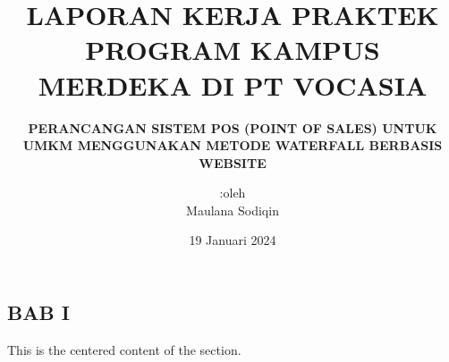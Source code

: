 \documentclass{article}
\date{19 Januari 2024}
\title{\textbf{LAPORAN KERJA PRAKTEK PROGRAM KAMPUS MERDEKA
		DI PT VOCASIA}}
\subtitle{\textbf{PERANCANGAN SISTEM POS (POINT OF SALES) UNTUK UMKM MENGGUNAKAN METODE WATERFALL BERBASIS WEBSITE}}
\author{:oleh \\ Maulana Sodiqin}
\begin{document}
\maketitle

\begin{center}
	\section*{\textbf{ BAB I}}
\end{center}
\begin{center}
	This is the centered content of the section.
\end{center}
\end{document}
